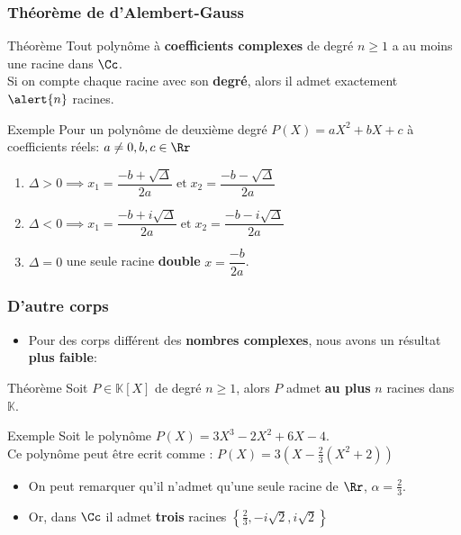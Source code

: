 \documentclass{beamer}
\newcommand{\setK}{\mathbb{K}}
\begin{document}
\begin{frame}[t]
  \frametitle{Théorème de d'Alembert-Gauss}
  \begin{block}{Théorème}
    Tout polynôme à \textbf{\alert{coefficients complexes}}  de degré $n\geq 1$
    a au moins une racine dans $\Cc$.\\

    Si on compte chaque racine avec son \textbf{degré}, alors il admet
    exactement  $\alert{n}$ racines.
  \end{block}
  \pause

  \begin{block}{Exemple}
    \small
    Pour un polynôme de deuxième degré $P(X) = aX^2 + bX + c$ à coefficients
    réels: $a\neq 0, b,c \in \Rr$ 
    \begin{enumerate}
      \small
      \item $\Delta >0\implies x_1 = \dfrac{-b + \sqrt{\Delta}}{2a} 
        \;\text{et}\; x_2 = \dfrac{-b - \sqrt{\Delta}}{2a}$ 
      \item $\Delta <0\implies x_1 = \dfrac{-b + i\sqrt{\Delta}}{2a} 
        \;\text{et}\; x_2 = \dfrac{-b - i\sqrt{\Delta}}{2a}$ 
      \item $\Delta =0$  une seule racine \textbf{\alert{double}}  $x =
        \dfrac{-b}{2a}$.
    \end{enumerate}
  \end{block}
\end{frame}
\begin{frame}[t]
  \frametitle{D'autre corps}
  \begin{itemize}
    \item Pour des corps différent des \textbf{nombres complexes}, nous avons un
   résultat \textbf{\alert{plus faible}}:
  \end{itemize}


 \begin{block}{Théorème}
   Soit $P\in \setK[X]$ de degré $n\geq 1$, alors $P$ admet \textbf{\alert{au
   plus}} $n$ racines dans $\setK$.
 \end{block} 
 \pause
 
 \begin{block}{Exemple}
   Soit le polynôme $ P(X) = 3X^3 - 2X^2 + 6X -4$.\\

   Ce polynôme peut être ecrit comme : $P(X) = 3(X-\frac{2}{3}(X^2+2)) $
   \begin{itemize}
     \item On peut remarquer qu'il n'admet qu'une seule racine de $\Rr$,
       $\alpha=\frac{2}{3}$.\\[4pt]
     \item Or, dans $\Cc$ il admet \textbf{trois}  racines $\left\{\frac{2}{3},
       -i\sqrt{2}, i\sqrt{2}\right\}$
   \end{itemize}
 \end{block}
\end{frame}
\end{document}
